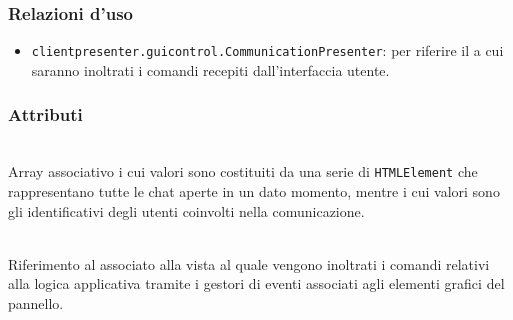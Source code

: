 \subsubsection*{Relazioni d'uso}
\begin{itemize}
  \item \texttt{clientpresenter.guicontrol.CommunicationPresenter}: per riferire il  a cui saranno inoltrati i comandi recepiti dall'interfaccia utente.
\end{itemize}

\subsubsection*{Attributi}
\begin{description}

  \item{}\\
  Array associativo i cui valori sono costituiti da una serie di \verb'HTMLElement' che rappresentano tutte le chat aperte in un dato momento, mentre i cui valori sono gli identificativi degli utenti coinvolti nella comunicazione.

  \item{}\\
  Riferimento al  associato alla vista al quale vengono inoltrati i comandi relativi alla logica applicativa tramite i gestori di eventi associati agli elementi grafici del pannello.
\end{description}

